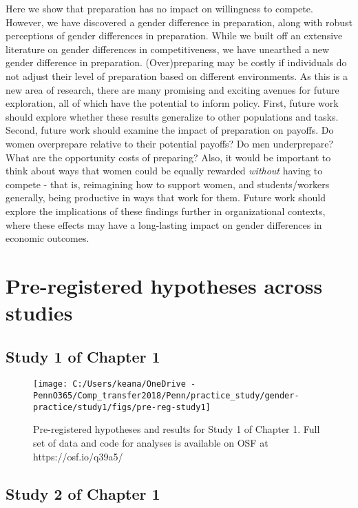 \documentclass[letterpaper, nobind]{templates/ociamthesis}
\begin{document}
Here we show that preparation has no impact on willingness to compete. However, we have discovered a gender difference in preparation, along with robust perceptions of gender differences in preparation. While we built off an extensive literature on gender differences in competitiveness, we have unearthed a new gender difference in preparation. (Over)preparing may be costly if individuals do not adjust their level of preparation based on different environments. As this is a new area of research, there are many promising and exciting avenues for future exploration, all of which have the potential to inform policy. First, future work should explore whether these results generalize to other populations and tasks. Second, future work should examine the impact of preparation on payoffs. Do women overprepare relative to their potential payoffs? Do men underprepare? What are the opportunity costs of preparing? Also, it would be important to think about ways that women could be equally rewarded \emph{without} having to compete - that is, reimagining how to support women, and students/workers generally, being productive in ways that work for them. Future work should explore the implications of these findings further in organizational contexts, where these effects may have a long-lasting impact on gender differences in economic outcomes.

\startappendices

\hypertarget{pre-registered-hypotheses-across-studies}{%
\chapter{Pre-registered hypotheses across studies}\label{pre-registered-hypotheses-across-studies}}

\hypertarget{study-1-of-chapter-1}{%
\section{Study 1 of Chapter 1}\label{study-1-of-chapter-1}}

\begin{figure}
\texttt{[image: C:/Users/keana/OneDrive - PennO365/Comp\_transfer2018/Penn/practice\_study/gender-practice/study1/figs/pre-reg-study1]} \caption{Pre-registered hypotheses and results for Study 1 of Chapter 1. Full set of data and code for analyses is available on OSF at https://osf.io/q39a5/}\label{fig:pre-reg-study1}
\end{figure}

\hypertarget{study-2-of-chapter-1}{%
\section{Study 2 of Chapter 1}\label{study-2-of-chapter-1}}
\end{document}
